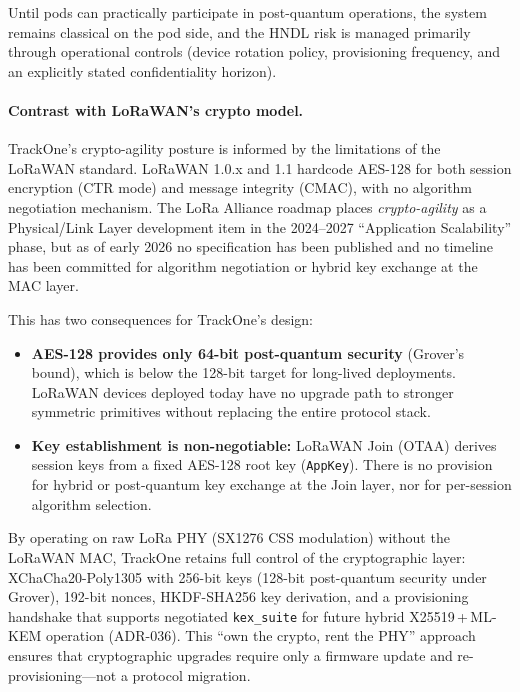 Until pods can practically participate in post-quantum operations, the system remains classical on the pod side, and
the HNDL risk is managed primarily through operational controls (device rotation policy, provisioning frequency, and an
explicitly stated confidentiality horizon).

\paragraph{Contrast with LoRaWAN's crypto model.}
TrackOne's crypto-agility posture is informed by the limitations of the \ac{LoRa}WAN standard.
\ac{LoRa}WAN 1.0.x and 1.1 hardcode AES-128 for both session encryption (\ac{CT}R mode) and
message integrity (CMAC), with no algorithm negotiation mechanism.
The \ac{LoRa} Alliance roadmap places \emph{crypto-agility} as a Physical/Link Layer
development item in the 2024--2027 ``Application Scalability'' phase, but as of
early 2026 no specification has been published and no timeline has been committed
for algorithm negotiation or hybrid key exchange at the MAC layer.

This has two consequences for TrackOne's design:
\begin{itemize}[nosep]
        \item \textbf{AES-128 provides only 64-bit post-quantum security} (Grover's bound),
        which is below the 128-bit target for long-lived deployments.
        \ac{LoRa}WAN devices deployed today have no upgrade path to stronger symmetric
        primitives without replacing the entire protocol stack.
        \item \textbf{Key establishment is non-negotiable:}
        \ac{LoRa}WAN Join (OTAA) derives session keys from a fixed AES-128 root key
        (\texttt{AppKey}).
        There is no provision for hybrid or post-quantum key exchange at the
        Join layer, nor for per-session algorithm selection.
\end{itemize}

By operating on raw \ac{LoRa} PHY (SX1276 CSS modulation) without the \ac{LoRa}WAN MAC,
TrackOne retains full control of the cryptographic layer:
XChaCha20-Poly1305 with 256-bit keys (128-bit post-quantum security under Grover),
192-bit nonces, \ac{HKDF}-\ac{SHA}256 key derivation, and a provisioning handshake that
supports negotiated \texttt{kex\_suite} for future hybrid X25519\,+\,ML-KEM
operation (\ac{ADR}-036).
This ``own the crypto, rent the PHY'' approach ensures that cryptographic upgrades
require only a firmware update and re-provisioning---not a protocol migration.

